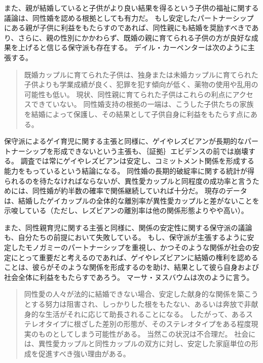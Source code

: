 \documentclass[paper=a4,book,openany]{jlreq}
\begin{document}
また、親が結婚していると子供がより良い結果を得るという子供の福祉に関する議論は、同性婚を認める根拠としても有力だ。
もし安定したパートナーシップにある親が子供に利益をもたらすのであれば、同性親にも結婚を奨励すべきであり、さらに、親の性別にかかわらず、既婚の親に育てられる子供の方が良好な成果を上げると信じる保守派も存在する。
デイル・カーペンターは次のように主張する。

\begin{quote}
既婚カップルに育てられた子供は、独身または未婚カップルに育てられた子供よりも学業成績が良く、犯罪を犯す傾向が低く、薬物の使用や乱用の可能性も低い。
現状、同性親に育てられた子供はこれらの利点にアクセスできていない。
同性婚支持の根拠の一端は、こうした子供たちの家族を結婚によって保護し、その結果として子供自身に利益をもたらす点にある。
\citep{volokh05:_volok_consp}

\end{quote}

保守派によるゲイ育児に関する主張と同様に、ゲイやレズビアンが長期的なパートナーシップを形成できないという主張も、｛証拠｝{エビデンス}の前では崩壊する。
調査では常にゲイやレズビアンは安定し、コミットメント関係を形成する能力をもっているという結論になる。
同性婚の長期的破綻率に関する統計が得られるのを待たなければならないが、異性愛カップルと同程度の成功率と言うためには、同性婚が約半数の確率で関係継続していれば十分だ。
現存のデータは、結婚したゲイカップルの全体的な離別率が異性愛カップルと差がないことを示唆している（ただし、レズビアンの離別率は他の関係形態よりやや高い）\citep{ketcham19:_compar_coupl_stabil,kolk20:_two_decad_same_sex_marriag_sweden}。

また、同性親育児に関する主張と同様に、関係の安定性に関する保守派の議論も、自分たちの前提において失敗している。
もし、保守派が主張するように安定したモノガミーのパートナーシップを重視し、かつそのような関係が社会の安定にとって重要だと考えるのであれば、ゲイやレズビアンに結婚の権利を認めることは、彼らがそのような関係を形成するのを助け、結果として彼ら自身および社会全体に利益をもたらすであろう。
マーサ・ヌスバウムは次のように言う。

\begin{quote}
同性愛の人々が法的に結婚できない場合、安定した献身的な関係を築こうとする努力は阻害され、しっかりした根をもたない、あるいは奔放で非献身的な生活がそれに応じて助長されることになる。
したがって、あるステレオタイプに根ざした差別の形態が、そのステレオタイプをある程度現実のものとしてしまう可能性がある。
当然この状況は不合理だ。
社会には、異性愛カップルと同性カップルの双方に対し、安定した家庭単位の形成を促進すべき強い理由がある。
\citep[pp.202--203]{nussbaum99:_sex_and_social_justic}
\end{quote}
\end{document}
